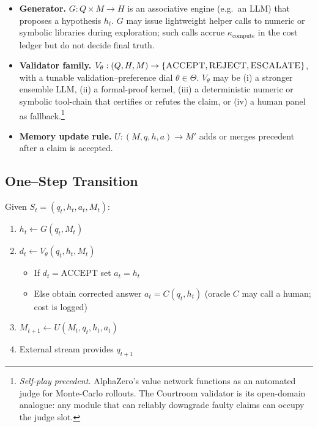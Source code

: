 \documentclass[11pt]{article}
\begin{document}
\begin{itemize}
  \item \textbf{Generator.}  
  \(G : Q \times M \to H\) is an associative engine (e.g.\ an LLM) that proposes a
  hypothesis \(h_t\).  
  \(G\) may issue lightweight helper calls to numeric or symbolic libraries
  during exploration; such calls accrue \(\kappa_{\text{compute}}\) in the cost ledger
  but do not decide final truth.
  
  \item \textbf{Validator family.}  
  \(V_{\theta} : (Q, H, M) \to \{\textsc{ACCEPT}, \textsc{REJECT}, \textsc{ESCALATE}\}\), with a
  tunable validation–preference dial \(\theta \in \Theta\).
  \(V_{\theta}\) may be
  (i) a stronger ensemble LLM,
  (ii) a formal-proof kernel,
  (iii) a deterministic numeric or symbolic tool-chain that certifies or refutes the claim, or
  (iv) a human panel as fallback.\footnote{\textit{Self-play precedent.}  
  AlphaZero's value network functions as an automated judge for Monte-Carlo rollouts.
  The Courtroom validator is its open-domain analogue: any module that can reliably
  downgrade faulty claims can occupy the judge slot.}
  
  \item \textbf{Memory update rule.}  
  \(U : (M, q, h, a) \to M'\) adds or merges precedent after a claim is accepted.
  
  \end{itemize}

\subsection{One--Step Transition}
\label{sec:transition}

Given $S_t=(q_t,h_t,a_t,M_t)$:
\begin{enumerate}
  \item $h_t \leftarrow G(q_t,M_t)$
  \item $d_t \leftarrow V_\theta(q_t,h_t,M_t)$
        \begin{itemize}
          \item If $d_t=\mathrm{ACCEPT}$ set $a_t=h_t$
          \item Else obtain corrected answer $a_t = C(q_t,h_t)$
                (oracle $C$ may call a human; cost is logged)
        \end{itemize}
  \item $M_{t+1} \leftarrow U(M_t,q_t,h_t,a_t)$
  \item External stream provides $q_{t+1}$
\end{enumerate}
\end{document}
